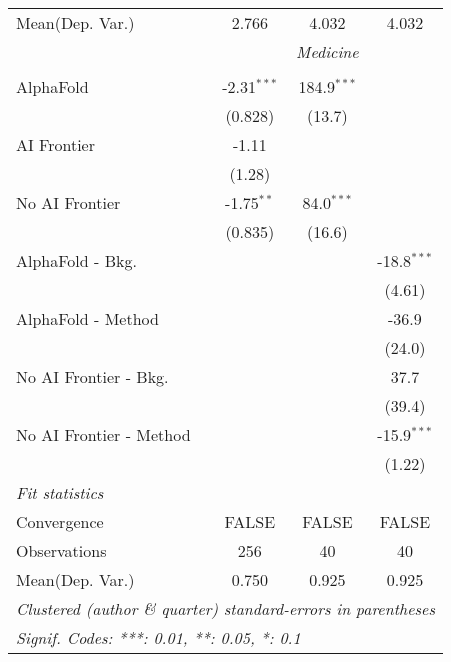 \begin{tabular}{lccc}
Mean(Dep. Var.) & 2.766 & 4.032 & 4.032 \\
 & \multicolumn{3}{c}{\textit{Medicine}} \\ \\
   AlphaFold               & -2.31$^{***}$ & 184.9$^{***}$ &   \\   
                           & (0.828)       & (13.7)        &   \\   
   AI Frontier             & -1.11         &               &   \\   
                           & (1.28)        &               &   \\   
   No AI Frontier          & -1.75$^{**}$  & 84.0$^{***}$  &   \\   
                           & (0.835)       & (16.6)        &   \\   
   AlphaFold - Bkg.        &               &               & -18.8$^{***}$\\   
                           &               &               & (4.61)\\   
   AlphaFold - Method      &               &               & -36.9\\   
                           &               &               & (24.0)\\   
   No AI Frontier - Bkg.   &               &               & 37.7\\   
                           &               &               & (39.4)\\   
   No AI Frontier - Method &               &               & -15.9$^{***}$\\   
                           &               &               & (1.22)\\   
   \midrule
   \emph{Fit statistics}\\
   Convergence             &FALSE          & FALSE         & FALSE\\  
   Observations            & 256           & 40            & 40\\  
Mean(Dep. Var.) & 0.750 & 0.925 & 0.925 \\
   \midrule \midrule
   \multicolumn{4}{l}{\emph{Clustered (author \& quarter) standard-errors in parentheses}}\\
   \multicolumn{4}{l}{\emph{Signif. Codes: ***: 0.01, **: 0.05, *: 0.1}}\\
\end{tabular}
\par\endgroup
